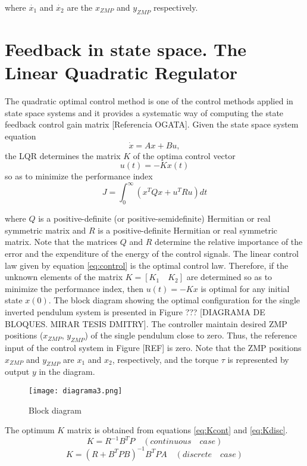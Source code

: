 where $\dot{x_1} $ and $\dot{x_2}$ are the $x_{ZMP}$ and $y_{ZMP}$ respectively.


\section{Feedback in state space. The Linear Quadratic Regulator}

The quadratic optimal control method is one of the control methods applied in state space systems and it provides a systematic way of computing the state feedback control gain matrix [Referencia OGATA].
Given the state space system equation
\begin{equation}
\dot{x} = Ax+Bu ,
\label{eq:sseq}
\end{equation}
the LQR determines the matrix $K$ of the optima control vector
\begin{equation}
u(t) = -Kx(t)
\label{eq:control}
\end{equation}
so as to minimize the performance index
\begin{equation}
J = \int_{0}^{\infty}(x^{T}Qx+u^{T}Ru) dt
\end{equation}

where $Q$ is a positive-definite (or positive-semidefinite) Hermitian or real symmetric matrix and $R$ is a positive-definite Hermitian or real symmetric matrix. Note that the matrices $Q$ and $R$ determine the relative importance of the error and the expenditure of the energy of the control signals.
The linear control law given by equation \ref{eq:control} is the optimal control law. Therefore, if the unknown elements of the matrix $K = [K_1 \quad K_2]$ are determined so as to minimize the performance index, then $u(t) = -Kx$  is optimal for any initial state $x(0)$. The block diagram showing the optimal configuration for the single inverted pendulum system is presented in Figure ??? [DIAGRAMA DE BLOQUES. MIRAR TESIS DMITRY]. The controller maintain desired ZMP positions ($x_{ZMP}$, $y_{ZMP}$) of the single pendulum close to zero. Thus, the reference input of the control system in Figure [REF] is zero. Note that the ZMP positions $x_{ZMP}$ and $y_{ZMP}$ are $x_1$ and $x_2$, respectively, and the torque $\tau$ is represented by output $y$ in the diagram.

\begin{figure}[!hbt]
\centering
\texttt{[image: diagrama3.png]}
\caption{Block diagram}
\end{figure}


The optimum $K$ matrix is obtained from equations \ref{eq:Kcont} and \ref{eq:Kdisc}.
\begin{equation}
K = R^{-1}B^{T}P \quad (continuous \quad case)
\label{eq:Kcont}
\end{equation}
\begin{equation}
K = (R + B^{T}PB)^{-1}B^{T}PA \quad (discrete \quad case)
\label{eq:Kdisc}
\end{equation}

